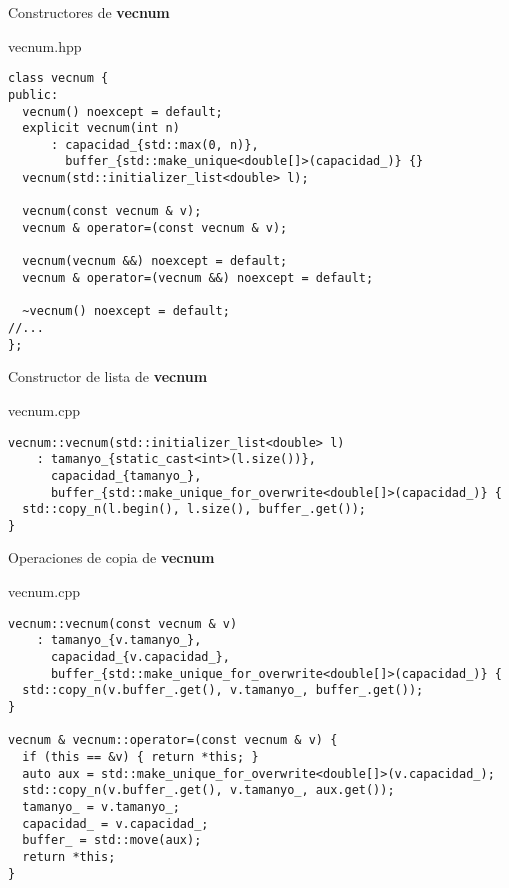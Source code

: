 \begin{frame}[t,fragile]{Constructores de \textbf{vecnum}}
\begin{block}{vecnum.hpp}
\begin{lstlisting}
class vecnum {
public:
  vecnum() noexcept = default;
  explicit vecnum(int n)
      : capacidad_{std::max(0, n)},
        buffer_{std::make_unique<double[]>(capacidad_)} {}
  vecnum(std::initializer_list<double> l);

  vecnum(const vecnum & v);
  vecnum & operator=(const vecnum & v);

  vecnum(vecnum &&) noexcept = default;
  vecnum & operator=(vecnum &&) noexcept = default;

  ~vecnum() noexcept = default;
//...
};
\end{lstlisting}
\end{block}
\end{frame}

\begin{frame}[t,fragile]{Constructor de lista de \textbf{vecnum}}
\begin{block}{vecnum.cpp}
\begin{lstlisting}
vecnum::vecnum(std::initializer_list<double> l)
    : tamanyo_{static_cast<int>(l.size())},
      capacidad_{tamanyo_},
      buffer_{std::make_unique_for_overwrite<double[]>(capacidad_)} {
  std::copy_n(l.begin(), l.size(), buffer_.get());
}
\end{lstlisting}
\end{block}
\end{frame}

\begin{frame}[t,fragile]{Operaciones de copia de \textbf{vecnum}}
\begin{block}{vecnum.cpp}
\begin{lstlisting}
vecnum::vecnum(const vecnum & v)
    : tamanyo_{v.tamanyo_},
      capacidad_{v.capacidad_},
      buffer_{std::make_unique_for_overwrite<double[]>(capacidad_)} {
  std::copy_n(v.buffer_.get(), v.tamanyo_, buffer_.get());
}

vecnum & vecnum::operator=(const vecnum & v) {
  if (this == &v) { return *this; }
  auto aux = std::make_unique_for_overwrite<double[]>(v.capacidad_);
  std::copy_n(v.buffer_.get(), v.tamanyo_, aux.get());
  tamanyo_ = v.tamanyo_;
  capacidad_ = v.capacidad_;
  buffer_ = std::move(aux);
  return *this;
}
\end{lstlisting}
\end{block}
\end{frame}

